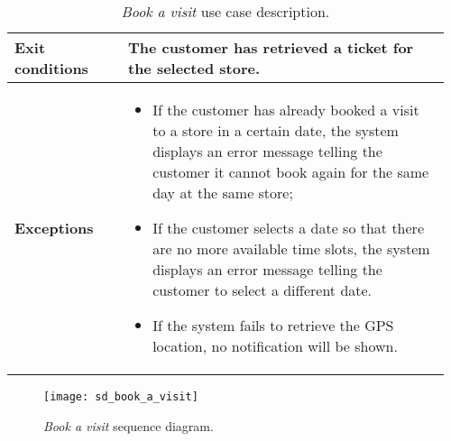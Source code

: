 \begin{table}[H]
\begin{tabular}{@{}p{0.25\linewidth}p{0.71\linewidth}@{}}
        \midrule
        \textbf{Exit conditions} & The customer has retrieved a ticket for the selected store. \\
        \midrule
        \textbf{Exceptions} &
        \begin{itemize}[leftmargin=.4cm,noitemsep,topsep=0pt,before=\vspace{-3mm},after=\vspace{-4mm}]
            \item If the customer has already booked a visit to a store in a certain date, the system displays an error message telling the customer it cannot book again for the same day at the same store;
            \item If the customer selects a date so that there are no more available time slots, the system displays an error message telling the customer to select a different date.
            \item If the system fails to retrieve the GPS location, no notification will be shown.
        \end{itemize} \\

        \bottomrule
    \end{tabular}
    \caption{\textit{Book a visit} use case description.}
\end{table}

\begin{figure}[H]
    \centering
    \texttt{[image: sd\_book\_a\_visit]}
    \caption{\textit{Book a visit} sequence diagram.}
\end{figure}

